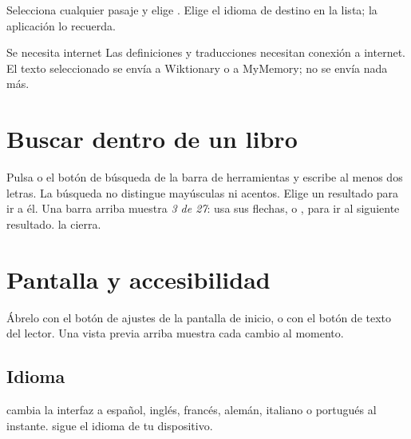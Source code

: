 \documentclass[11pt]{article}
\begin{document}
Selecciona cualquier pasaje y elige . Elige el idioma de destino en la lista; la
aplicación lo recuerda.

\begin{note}{Se necesita internet}
Las definiciones y traducciones necesitan conexión a internet. El texto seleccionado se envía a
Wiktionary o a MyMemory; no se envía nada más.
\end{note}

\section{Buscar dentro de un libro}\label{sec:search}

Pulsa  o el botón de búsqueda de la barra de herramientas y escribe al menos dos
letras. La búsqueda no distingue mayúsculas ni acentos. Elige un resultado para ir a él. Una barra
arriba muestra \emph{3 de 27}: usa sus flechas, o , para ir al siguiente resultado.
 la cierra.

\section{Pantalla y accesibilidad}\label{sec:display}

Ábrelo con el botón de ajustes de la pantalla de inicio, o con el botón de texto del lector. Una
vista previa arriba muestra cada cambio al momento.


\subsection{Idioma}
 cambia la interfaz a español, inglés, francés, alemán, italiano o
portugués al instante.  sigue el idioma de tu dispositivo.
\end{document}
